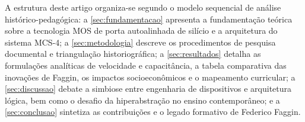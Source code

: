 
A estrutura deste artigo organiza-se segundo o modelo sequencial de análise histórico-pedagógica: a \cref{sec:fundamentacao} apresenta a fundamentação teórica sobre a tecnologia MOS de porta autoalinhada de silício e a arquitetura do sistema MCS-4; a \cref{sec:metodologia} descreve os procedimentos de pesquisa documental e triangulação historiográfica; a \cref{sec:resultados} detalha as formulações analíticas de velocidade e capacitância, a tabela comparativa das inovações de Faggin, os impactos socioeconômicos e o mapeamento curricular; a \cref{sec:discussao} debate a simbiose entre engenharia de dispositivos e arquitetura lógica, bem como o desafio da hiperabstração no ensino contemporâneo; e a \cref{sec:conclusao} sintetiza as contribuições e o legado formativo de Federico Faggin.
